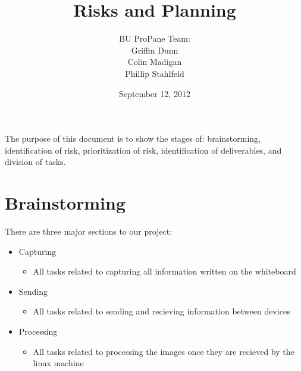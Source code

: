 \documentclass[]{article}
\begin{document}
	\setlength{\parindent}{0pt}

	\begin{titlepage}



		\title{\textbf{Risks and Planning}}
		\author{BU ProPane Team:\\Griffin Dunn\\Colin Madigan\\Phillip Stahlfeld}
		\date{September 12, 2012}
		\maketitle



		\noindent
		The purpose of this document is to show the stages of: brainstorming, identification of risk, prioritization of risk, identification of deliverables, and division of tasks. 
		\thispagestyle{empty}
		
		
		
	\end{titlepage}
	
	\thispagestyle{empty}
	
	
	\tableofcontents
	\newpage
	
	
	\setcounter{page}{1}
	\thispagestyle{empty}
	
	\section{Brainstorming}
		There are three major sections to our project:
				\begin{itemize}
					\item Capturing
					\begin{itemize}
						\item All tasks related to capturing all information written on the whiteboard
					\end{itemize}
					\item Sending
					\begin{itemize}
						\item All tasks related to sending and recieving information between devices
					\end{itemize}
					\item Processing
					\begin{itemize}
						\item All tasks related to processing the images once they are recieved by the linux machine
					\end{itemize}
				\end{itemize}
			
\end{document}
